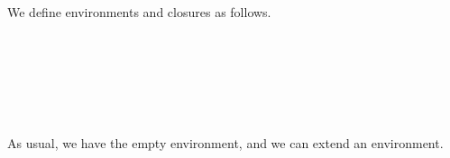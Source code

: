 We define environments and closures as follows.

\begin{fence}
\begin{code}%
\>[0]\AgdaSpace{}%
\AgdaSymbol{:}\AgdaSpace{}%
\AgdaSpace{}%
\AgdaSpace{}%
\<%
\\
%
\\[\AgdaEmptyExtraSkip]%
\>[0]\AgdaSpace{}%
\AgdaSpace{}%
\AgdaSymbol{:}\AgdaSpace{}%
\AgdaSpace{}%
\<%
\\
\>[0][@{}l@{\AgdaIndent{0}}]%
\>[2]\AgdaSpace{}%
\AgdaSymbol{:}\AgdaSpace{}%
\AgdaSymbol{\}}\AgdaSpace{}%
\AgdaSpace{}%
\AgdaSymbol{(}\AgdaSpace{}%
\AgdaSymbol{:}\AgdaSpace{}%
\AgdaSpace{}%
\AgdaSpace{}%
\AgdaSymbol{)}\AgdaSpace{}%
\AgdaSpace{}%
\AgdaSpace{}%
\AgdaSpace{}%
\AgdaSpace{}%
\<%
\\
%
\\[\AgdaEmptyExtraSkip]%
\>[0]\AgdaSpace{}%
\AgdaSpace{}%
\AgdaSymbol{=}\AgdaSpace{}%
\AgdaSpace{}%
\AgdaSymbol{(}\AgdaSpace{}%
\AgdaSymbol{:}\AgdaSpace{}%
\AgdaSpace{}%
\AgdaSpace{}%
\AgdaSymbol{)}\AgdaSpace{}%
\AgdaSpace{}%
\<%
\end{code}
\end{fence}

As usual, we have the empty environment, and we can extend an
environment.

